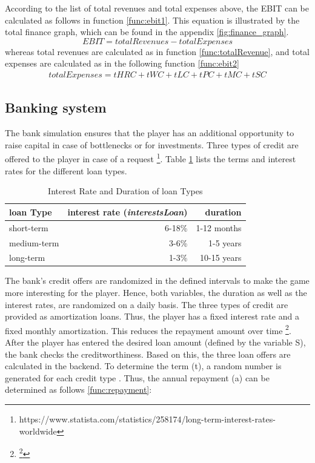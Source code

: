 According to the list of total revenues and total expenses above, the EBIT can be calculated as follows in function \ref{func:ebit1}. This equation is illustrated by the total finance graph, which can be found in the appendix \ref{fig:finance_graph}.  
\begin{equation}
\label{func:ebit1}
    EBIT = totalRevenues - totalExpenses
\end{equation}
whereas total revenues are calculated as in function \ref{func:totalRevenue}, and total expenses are calculated as in the following function \ref{func:ebit2}
\begin{equation}
    \label{func:ebit2}
    \begin{aligned}
       totalExpenses = tHRC + tWC + tLC + tPC + tMC + tSC
    \end{aligned}
\end{equation}

\subsection{Banking system}
\label{sec: banking}

The bank simulation ensures that the player has an additional opportunity to raise capital in case of bottlenecks or for investments. Three types of credit are offered to the player in case of a request \footnote{https://www.statista.com/statistics/258174/long-term-interest-rates-worldwide}. Table \ref{loan_types} lists the terms and interest rates for the different loan types. 

\begin{table}[ht]
\centering
\begin{tabular}{|l|r|r|}
\hline
loan Type       & interest rate (\textit{interestsLoan})     & duration \\ \hline
short-term      & 6-18\%           & 1-12 months    \\
medium-term     & 3-6\%            & 1-5 years     \\
long-term       & 1-3\%             & 10-15 years     \\
\hline
\end{tabular}
\caption{Interest Rate and Duration of loan Types}
\label{loan_types}
\end{table}

The bank's credit offers are randomized in the defined intervals to make the game more interesting for the player. Hence, both variables, the duration as well as the interest rates, are randomized on a daily basis. The three types of credit are provided as amortization loans. Thus, the player has a fixed interest rate and a fixed monthly amortization. This reduces the repayment amount over time \footnote{\footnote{https://www.investopedia.com/terms/a/amortized\_loan.asp}}.
After the player has entered the desired loan amount (defined by the variable \gls{S}), the bank checks the creditworthiness. Based on this, the three loan offers are calculated in the backend. To determine the term (\gls{t}), a random number is generated for each credit type . Thus, the annual repayment (\gls{a}) can be determined as follows \ref{func:repayment}:

